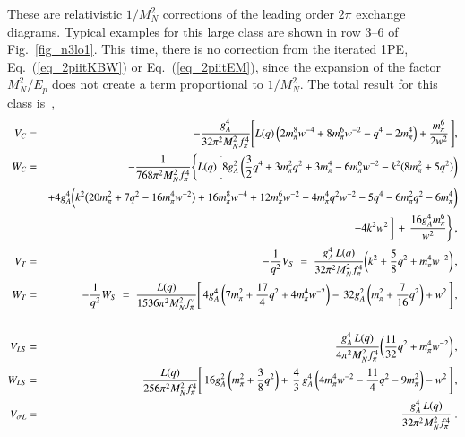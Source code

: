 \documentclass[sort&compress,preprint,3p]{elsarticle}
\begin{document}
These are relativistic $1/M_N^2$ corrections of the leading order
$2\pi$ exchange diagrams. Typical examples
for this large class are shown in row 3--6 of
Fig.~\ref{fig_n3lo1}. 
This time, there is no correction from the iterated 1PE, 
Eq.~(\ref{eq_2piitKBW}) or
Eq.~(\ref{eq_2piitEM}),
since the expansion of the factor $M^2_N/E_p$ does not create
a term proportional to $1/M^2_N$. 
The total result for this class is~\cite{Kai01b},
\begin{eqnarray} 
V_C &=& -{g_A^4 \over 32\pi^2 M_N^2 f_\pi^4}
\Bigg[ 
L(q) \, \Big(2m_\pi^8 w^{-4}+8m_\pi^6 w^{-2} -q^4 -2m_\pi^4\Big)
+{ m_\pi^6 \over 2 w^{2}}\, 
\Bigg] ,
\label{eq_4M2C}
\\
W_C           &=& -{1\over 768\pi^2 M_N^2 f_\pi^4} \Bigg\{ L(q) 
\, \bigg[
                8g_A^2 \, \bigg({3\over 2} q^4 +3m_\pi^2 q^2 
+3m_\pi^4
               -6m_\pi^6 w^{-2} 
               -k^2(8m_\pi^2 +5q^2) \bigg)
\nonumber \\   && 
                + 4g_A^4 
                \bigg(k^2\big(20m_\pi^2+7q^2-16m_\pi^4 w^{-2}\big) 
                +16m_\pi^8 w^{-4}
                +12 m_\pi^6 w^{-2} 
-4m_\pi^4q^2w^{-2} -5q^4 -6m_\pi^2 q^2-6m_\pi^4 \bigg) 
\nonumber \\   && 
               -4k^2 w^2 \, \bigg]
                \,+\, {16 g_A^4 m_\pi^6 \over w^{2}} \Bigg\} \,,
\\
V_T &=& -{1\over q^2} V_S
    \; = \; {g_A^4 \, L(q) \over 32\pi^2 M_N^2 f_\pi^4} 
        \bigg(k^2+{5\over 8} q^2 +m_\pi^4 w^{-2} \bigg) \,,
\\
W_T &=& -{1\over q^2} W_S 
    \; = \; { L(q) \over 1536\pi^2 M_N^2 f_\pi^4} 
\Bigg[\, 4 g_A^4\, \bigg( 7m_\pi^2+{17\over 4} q^2 +4m_\pi^4 
w^{-2} \bigg) 
                 -\, 32 g_A^2\, \bigg( m_\pi^2+{7\over 16}q^2 \bigg) 
                 + w^2 \, \Bigg] \,, 
\nonumber \\
\\
V_{LS} &=& {g_A^4 \, L(q) \over 4\pi^2 M_N^2 f_\pi^4} 
\bigg( {11 \over 32} q^2 +m_\pi^4 w^{-2}\bigg) \,,
\\
W_{LS} &=&  { L(q) \over 256 \pi^2 M_N^2 f_\pi^4}
\Bigg[\, 16 g_A^2\, \bigg( m_\pi^2+{3\over 8}q^2\bigg)
+ \,\frac43\, g_A^4\, \bigg( 4m_\pi^4 w^{-2}-{11\over 4}q^2 
-9m_\pi^2 \bigg) 
                      -w^2 \, \Bigg] \,,
\\
V_{\sigma L} &=& {g_A^4 \, L(q) \over 32\pi^2 M_N^2 f_\pi^4}\;.
\label{eq_4M2sL}
\end{eqnarray} 
\end{document}
